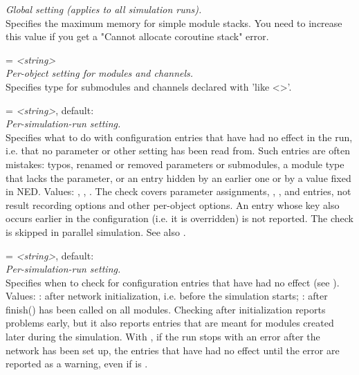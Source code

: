 \begin{description}
    \textit{Global setting (applies to all simulation runs).}\\
    Specifies the maximum memory for  simple module stacks. You
    need to increase this value if you get a "Cannot allocate coroutine stack"
    error.
\item[**.typename] = \textit{<string>}\\
    \textit{Per-object setting for modules and channels.}\\
    Specifies type for submodules and channels declared with 'like <>'.
\item[unused-entry-check] = \textit{<string>}, default: \\
    \textit{Per-simulation-run setting.}\\
    Specifies what to do with configuration entries that have had no effect in
    the run, i.e. that no parameter or other setting has been read from. Such
    entries are often mistakes: typos, renamed or removed parameters or
    submodules, a module type that lacks the parameter, or an entry hidden by
    an earlier one or by a value fixed in NED. Values: ,
    , . The check covers parameter assignments,
    , ,
     and  entries, not
    result recording options and other per-object options. An entry whose key
    also occurs earlier in the configuration (i.e. it is overridden) is not
    reported. The check is skipped in parallel simulation. See also
    .
\item[unused-entry-check-time] = \textit{<string>}, default: \\
    \textit{Per-simulation-run setting.}\\
    Specifies when to check for configuration entries that have had no effect
    (see ). Values:
    : after network initialization, i.e. before the
    simulation starts; : after finish() has been called on all
    modules. Checking after initialization reports problems early, but it also
    reports entries that are meant for modules created later during the
    simulation. With , if the run stops with an error after the
    network has been set up, the entries that have had no effect until the
    error are reported as a warning, even if
     is .

\end{description}
